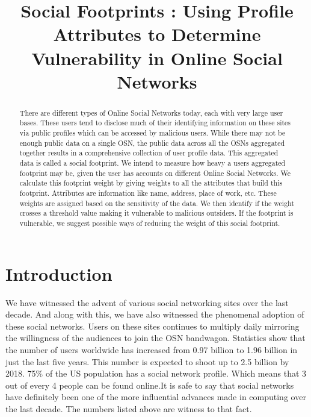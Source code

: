 \documentclass[12pt,conference]{IEEEtran}
\begin{document}
\title{Social Footprints : Using Profile Attributes to Determine Vulnerability in Online Social Networks}

\author{
}

\maketitle

\begin{abstract}
There are different types of Online Social Networks today, each with very large user bases. These users tend to disclose much of their identifying information on these sites via public profiles which can be accessed by malicious users. While there may not be enough public data on a single OSN, the public data across all the OSNs aggregated together results in a comprehensive collection of user profile data. This aggregated data is called a social footprint. We intend to measure how heavy a users aggregated footprint may be, given the user has accounts on different Online Social Networks. We calculate this footprint weight by giving weights to all the attributes that build this footprint. Attributes are information like name, address, place of work, etc. These weights are assigned based on the sensitivity of the data. We then identify if the weight crosses a threshold value making it vulnerable to malicious outsiders. If the footprint is vulnerable, we suggest possible ways of reducing the weight of this social footprint.
\end{abstract}


\section{Introduction}
We have witnessed the advent of various social networking sites over the last decade. And along with this, we have also witnessed the phenomenal adoption of these social networks. Users on these sites continues to multiply daily mirroring the willingness of the audiences to join the OSN bandwagon. Statistics show\cite{statswebsite} that the number of users worldwide has increased from 0.97 billion to 1.96 billion in just the last five years. This number is expected to shoot up to 2.5 billion by 2018. 75\% of the US population has a social network profile. Which means that 3 out of every 4 people can be found online.It is safe to say that social networks have definitely been one of the more influential advances made in computing over the last decade. The numbers listed above are witness to that fact.\\
\end{document}
